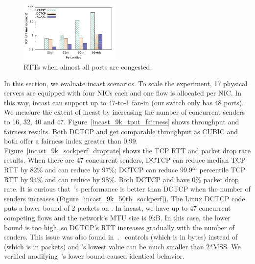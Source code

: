 
\begin{figure}[t]
        \centering
  \includegraphics[width=0.45\textwidth]{figures/incast/pressure/incast_pressure_compare_sockperf.pdf}
        \caption{RTTs when almost all ports are congested.}
        \label{sockperf_pressure_incast}
\end{figure}


In this section, we evaluate incast scenarios.
To scale the experiment, 17 physical servers are equipped with four NICs each
and one flow is allocated per NIC.
In this way, incast can support up to 47-to-1 fan-in (our switch only has 48 ports).
We measure the extent of incast by increasing the number of concurrent senders to 16, 32, 40 and 47.
Figure~\ref{incast_9k_tput_fairness} shows throughput and fairness results.
Both DCTCP and \acdc{} get comparable throughput as CUBIC and both offer a fairness index greater than 0.99.
Figure~\ref{incast_9k_sockperf_droprate} shows the TCP RTT and packet drop rate results.
When there are 47 concurrent senders, DCTCP can reduce median TCP RTT by 82\% and \acdc{} can reduce by 97\%;
DCTCP can reduce 99.9$^{th}$ percentile TCP RTT by 94\% and \acdc{} can reduce by 98\%.
Both DCTCP and \acdc{} have 0\% packet drop rate. It is curious that~\acdc{}’s
performance is better than DCTCP when the number of senders increases (Figure~\ref{incast_9k_50th_sockperf}).
The Linux DCTCP code puts a lower bound of 2 packets on \cwnd{}.
In incast, we have up to 47 concurrent competing flows and
the network's MTU size is 9kB. In this case, the lower bound is too high,
so DCTCP's RTT increases gradually with the number of senders.
This issue was also found in~\cite{judd2015nsdi}.~\acdc{} controls \rwnd{} (which is in bytes)
instead of \cwnd{} (which is in packets) and \rwnd{}'s lowest value can be much smaller than 2*MSS.
We verified modifying~\acdc{}'s lower bound caused identical behavior.


